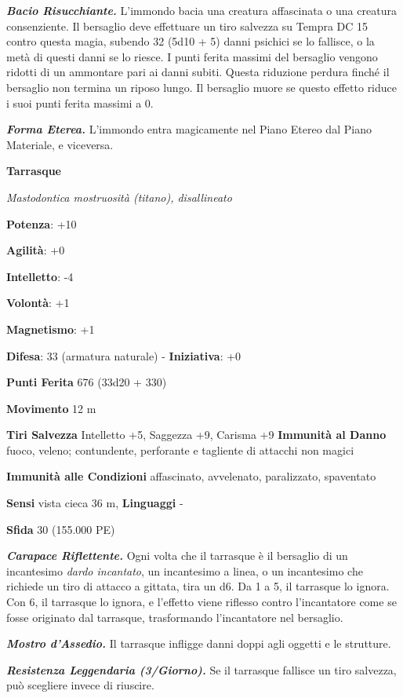 \begin{multicols}{2}
\emph{\textbf{Bacio Risucchiante.}} L'immondo bacia una creatura
affascinata o una creatura consenziente. Il bersaglio deve effettuare un
tiro salvezza su Tempra DC 15 contro questa magia, subendo 32
(5d10 + 5) danni psichici se lo fallisce, o la metà di questi danni se
lo riesce. I punti ferita massimi del bersaglio vengono ridotti di un
ammontare pari ai danni subiti. Questa riduzione perdura finché il
bersaglio non termina un riposo lungo. Il bersaglio muore se questo
effetto riduce i suoi punti ferita massimi a 0.

\emph{\textbf{Forma Eterea.}} L'immondo entra magicamente nel Piano
Etereo dal Piano Materiale, e viceversa.

\textbf{Tarrasque}

\emph{Mastodontica mostruosità (titano), disallineato}

\textbf{Potenza}: +10

\textbf{Agilità}: +0

\textbf{Intelletto}: -4

\textbf{Volontà}: +1

\textbf{Magnetismo}: +1

\textbf{Difesa}: 33 (armatura naturale) - \textbf{Iniziativa}: +0

\textbf{Punti Ferita} 676 (33d20 + 330)

\textbf{Movimento} 12 m

\textbf{Tiri Salvezza} Intelletto +5, Saggezza +9, Carisma +9
\textbf{Immunità al Danno} fuoco, veleno; contundente, perforante e
tagliente di attacchi non magici

\textbf{Immunità alle Condizioni} affascinato, avvelenato, paralizzato,
spaventato

\textbf{Sensi} vista cieca 36 m, 
\textbf{Linguaggi} -

\textbf{Sfida} 30 (155.000 PE)

\emph{\textbf{Carapace Riflettente.}} Ogni volta che il tarrasque è il
bersaglio di un incantesimo \emph{dardo incantato}, un incantesimo a
linea, o un incantesimo che richiede un tiro di attacco a gittata, tira
un d6. Da 1 a 5, il tarrasque lo ignora. Con 6, il tarrasque lo ignora,
e l'effetto viene riflesso contro l'incantatore come se fosse originato
dal tarrasque, trasformando l'incantatore nel bersaglio.

\emph{\textbf{Mostro d'Assedio.}} Il tarrasque infligge danni doppi agli
oggetti e le strutture.

\emph{\textbf{Resistenza Leggendaria (3/Giorno).}} Se il tarrasque
fallisce un tiro salvezza, può scegliere invece di riuscire.


\end{multicols}
